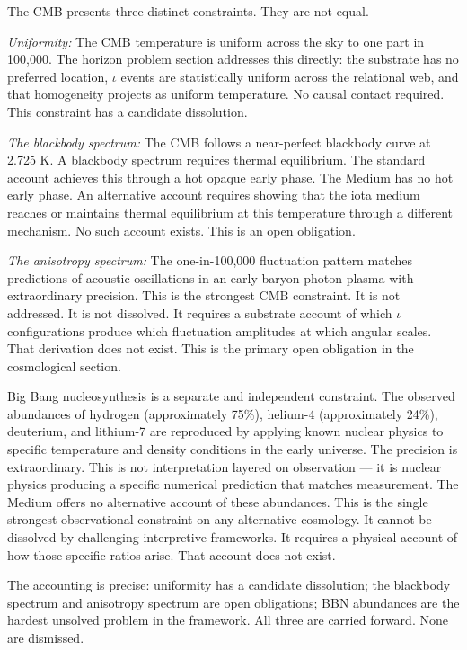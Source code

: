 \documentclass[11pt,letterpaper]{article}
\begin{document}
The CMB presents three distinct constraints. They are not equal.

\emph{Uniformity:} The CMB temperature is uniform across the sky to one part in 100,000. The horizon problem section addresses this directly: the substrate has no preferred location, \(\iota\) events are statistically uniform across the relational web, and that homogeneity projects as uniform temperature. No causal contact required. This constraint has a candidate dissolution.

\emph{The blackbody spectrum:} The CMB follows a near-perfect blackbody curve at 2.725 K. A blackbody spectrum requires thermal equilibrium. The standard account achieves this through a hot opaque early phase. The Medium has no hot early phase. An alternative account requires showing that the iota medium reaches or maintains thermal equilibrium at this temperature through a different mechanism. No such account exists. This is an open obligation.

\emph{The anisotropy spectrum:} The one-in-100,000 fluctuation pattern matches predictions of acoustic oscillations in an early baryon-photon plasma with extraordinary precision. This is the strongest CMB constraint. It is not addressed. It is not dissolved. It requires a substrate account of which \(\iota\) configurations produce which fluctuation amplitudes at which angular scales. That derivation does not exist. This is the primary open obligation in the cosmological section.

Big Bang nucleosynthesis is a separate and independent constraint. The observed abundances of hydrogen (approximately 75\%), helium-4 (approximately 24\%), deuterium, and lithium-7 are reproduced by applying known nuclear physics to specific temperature and density conditions in the early universe. The precision is extraordinary. This is not interpretation layered on observation --- it is nuclear physics producing a specific numerical prediction that matches measurement. The Medium offers no alternative account of these abundances. This is the single strongest observational constraint on any alternative cosmology. It cannot be dissolved by challenging interpretive frameworks. It requires a physical account of how those specific ratios arise. That account does not exist.

The accounting is precise: uniformity has a candidate dissolution; the blackbody spectrum and anisotropy spectrum are open obligations; BBN abundances are the hardest unsolved problem in the framework. All three are carried forward. None are dismissed.
\end{document}
